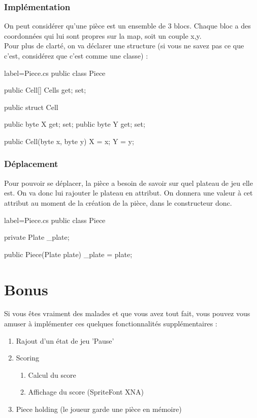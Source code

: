 \documentclass[a4paper]{article}
\begin{document}
\subsubsection{Implémentation}

On peut considérer qu'une pièce est un ensemble de 3 blocs. Chaque bloc a des
coordonnées qui lui sont propres sur la map, soit un couple x,y. \\

Pour plus de clarté, on va déclarer une structure (si vous ne savez pas ce que
c'est, considérez que c'est comme une classe) :

\begin{csharpcode*}{label=Piece.cs}
public class Piece
{
    public Cell[] Cells { get; set; }

    public struct Cell
    {
        public byte X { get; set; }
        public byte Y { get; set; }

        public Cell(byte x, byte y)
        {
            X = x;
            Y = y;
        }
    }
}
\end{csharpcode*}

\subsubsection{Déplacement}

Pour pouvoir se déplacer, la pièce a besoin de savoir sur quel plateau de jeu
elle est. On va donc lui rajouter le plateau en attribut. On donnera une valeur
à cet attribut au moment de la création de la pièce, dans le constructeur donc.

\begin{csharpcode*}{label=Piece.cs}
public class Piece
{
    private Plate _plate;

    public Piece(Plate plate)
    {
        _plate = plate;
    }
}
\end{csharpcode*}

\section{Bonus}

Si vous êtes vraiment des malades et que vous avez tout fait, vous pouvez vous
amuser à implémenter ces quelques fonctionnalités supplémentaires :

\begin{enumerate}
    \item Rajout d'un état de jeu 'Pause'
    \item Scoring
        \begin{enumerate}
            \item Calcul du score
            \item Affichage du score (SpriteFont XNA)
        \end{enumerate}
    \item Piece holding (le joueur garde une pièce en mémoire)
\end{enumerate}

%
\end{document}
